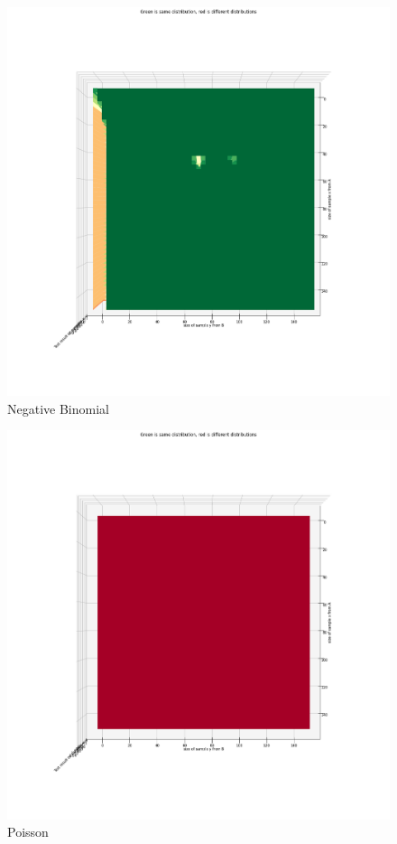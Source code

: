 \begin{figure}[htb]
  \centering
  \includegraphics[width=\linewidth]{./img/hypothesis_test/appendix/ttest_neg_bin.png}
  \caption{Negative Binomial}
\end{figure}
\clearpage
\begin{figure}[htb]
  \centering
  \includegraphics[width=\linewidth]{./img/hypothesis_test/appendix/ttest_poisson.png}
  \caption{Poisson}
\end{figure}
